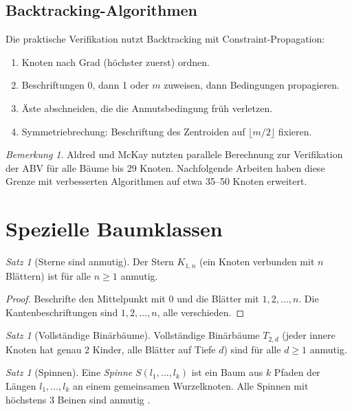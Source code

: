 \documentclass[12pt,a4paper]{amsart}
\theoremstyle{definition}
\theoremstyle{remark}
\newtheorem{satz}[theorem]{Satz}
\newtheorem{bemerkung}[theorem]{Bemerkung}
\begin{document}
\subsection{Backtracking-Algorithmen}

Die praktische Verifikation nutzt Backtracking mit Constraint-Propagation:
\begin{enumerate}[label=(\arabic*)]
  \item Knoten nach Grad (höchster zuerst) ordnen.
  \item Beschriftungen 0, dann 1 oder $m$ zuweisen, dann Bedingungen propagieren.
  \item Äste abschneiden, die die Anmutsbedingung früh verletzen.
  \item Symmetriebrechung: Beschriftung des Zentroiden auf $\lfloor m/2 \rfloor$ fixieren.
\end{enumerate}

\begin{bemerkung}
Aldred und McKay \cite{AldredMcKay1998} nutzten parallele Berechnung zur
Verifikation der ABV für alle Bäume bis 29 Knoten. Nachfolgende Arbeiten haben
diese Grenze mit verbesserten Algorithmen auf etwa 35--50 Knoten erweitert.
\end{bemerkung}

\section{Spezielle Baumklassen}\label{sec:spezielle}

\begin{satz}[Sterne sind anmutig]\label{satz:sterne}
Der Stern $K_{1,n}$ (ein Knoten verbunden mit $n$ Blättern) ist für alle
$n \geq 1$ anmutig.
\end{satz}

\begin{proof}
Beschrifte den Mittelpunkt mit $0$ und die Blätter mit $1, 2, \ldots, n$.
Die Kantenbeschriftungen sind $1, 2, \ldots, n$, alle verschieden.
\end{proof}

\begin{satz}[Vollständige Binärbäume]\label{satz:binaer}
Vollständige Binärbäume $T_{2,d}$ (jeder innere Knoten hat genau 2 Kinder, alle
Blätter auf Tiefe $d$) sind für alle $d \geq 1$ anmutig.
\end{satz}

\begin{satz}[Spinnen]\label{satz:spinnen}
Eine \emph{Spinne} $S(l_1, \ldots, l_k)$ ist ein Baum aus $k$ Pfaden der Längen
$l_1, \ldots, l_k$ an einem gemeinsamen Wurzelknoten. Alle Spinnen mit höchstens
3 Beinen sind anmutig \cite{Bahl2001}.
\end{satz}
\end{document}
